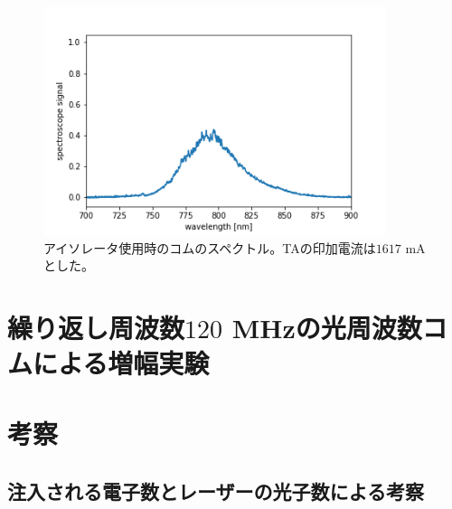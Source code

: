 \documentclass[uplatex, dvipdfmx, a4paper, report, papersize, 11pt]{jsbook}
\begin{document}
\begin{figure}[H]
 \begin{center}
  \includegraphics[width=100mm]{figures/chapter4/comb-spectrum_no-return.png}
\end{center}
 \caption{アイソレータ使用時のコムのスペクトル。TAの印加電流は$1617$ mAとした。}
 \label{spectrum_current_isolator}
\end{figure}



\section{繰り返し周波数$120$ MHzの光周波数コムによる増幅実験}

\section{考察}
\subsection{注入される電子数とレーザーの光子数による考察}
\end{document}
